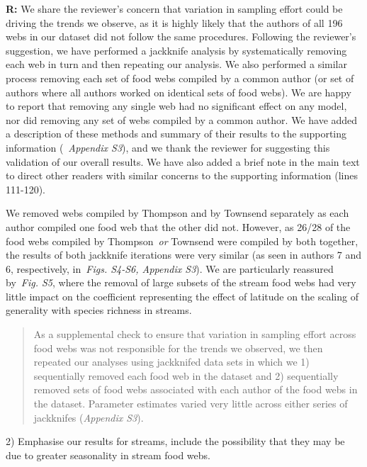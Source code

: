 \documentclass[12pt]{letter}
\begin{document}
  \textbf{R:} We share the reviewer's concern that variation in sampling
  effort could be driving the trends we observe, as it is highly likely that
  the authors of all 196 webs in our dataset did not follow the same procedures.
  Following the reviewer's suggestion, we have performed a jackknife analysis by
  systematically removing each web in turn and then repeating our analysis. We
  also performed a similar process removing each set of 
  food webs compiled by a common author (or set of authors
  where all authors worked on identical sets of food webs).
  We are happy to report that removing
  any single web had no significant effect on any model, 
  nor did removing any set of webs compiled by a common 
  author. 
  We have added a description of these methods and summary
  of their results to the supporting information 
  (~\emph{Appendix S3}), and we thank the reviewer for 
  suggesting this validation of our overall results. We 
  have also added a brief note in the main text to direct 
  other readers with similar concerns to the supporting 
  information (lines 111-120). 


  We removed webs compiled by Thompson and by 
  Townsend separately as each author compiled one food
  web that the other did not. However, as 26/28 of the
  food webs compiled by Thompson~\emph{or} Townsend were
  compiled by both together, the results of both jackknife
  iterations were very similar (as seen in authors 7 and 6, 
  respectively, in~\emph{Figs. S4-S6, Appendix S3}). 
  We are particularly reassured by~\emph{Fig. S5}, where
  the removal of large subsets of the stream food webs
  had very little impact on the coefficient representing
  the effect of latitude on the scaling of generality with
  species richness in streams.


  \begin{quotation}

    As a supplemental check to ensure that variation in sampling effort across
    food webs was not responsible for the trends we observed, we then repeated
    our analyses using jackknifed data sets in which we 1) sequentially removed
    each food web in the dataset and 2) sequentially removed sets of food webs 
    associated with each author of the food webs in the dataset. Parameter 
    estimates varied very little across either series of jackknifes (\emph{Appendix S3}).

  \end{quotation}


   2) Emphasise our results for streams, include the possibility that they
   may be due to greater seasonality in stream food webs. 
\end{document}

